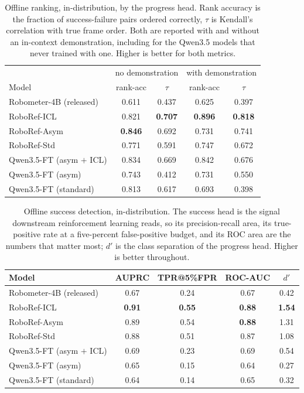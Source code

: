\begin{table}[t]
\centering\footnotesize
\caption[Offline ranking, in-distribution]{Offline ranking, in-distribution, by the progress head. Rank accuracy is the fraction of success-failure pairs ordered correctly, $\tau$ is Kendall's correlation with true frame order. Both are reported with and without an in-context demonstration, including for the Qwen3.5 models that never trained with one. Higher is better for both metrics.}
\label{tab:offline-id-rank}
\begin{tabular}{@{}lcccc@{}}
\toprule
 & \multicolumn{2}{c}{no demonstration} & \multicolumn{2}{c}{with demonstration} \\
Model & rank-acc & $\tau$ & rank-acc & $\tau$ \\
\midrule
Robometer-4B (released) & 0.611 & 0.437 & 0.625 & 0.397 \\
RoboRef-ICL & 0.821 & \textbf{0.707} & \textbf{0.896} & \textbf{0.818} \\
RoboRef-Asym & \textbf{0.846} & 0.692 & 0.731 & 0.741 \\
RoboRef-Std & 0.771 & 0.591 & 0.747 & 0.672 \\
Qwen3.5-FT (asym $+$ ICL) & 0.834 & 0.669 & 0.842 & 0.676 \\
Qwen3.5-FT (asym) & 0.743 & 0.412 & 0.731 & 0.550 \\
Qwen3.5-FT (standard) & 0.813 & 0.617 & 0.693 & 0.398 \\
\bottomrule
\end{tabular}
\end{table}

\begin{table}[t]
\centering\footnotesize
\caption[Offline success detection, in-distribution]{Offline success detection, in-distribution. The success head is the signal downstream reinforcement learning reads, so its precision-recall area, its true-positive rate at a five-percent false-positive budget, and its ROC area are the numbers that matter most; $d'$ is the class separation of the progress head. Higher is better throughout.}
\label{tab:offline-id-succ}
\begin{tabular}{@{}lcccc@{}}
\toprule
Model & AUPRC & TPR@5\%FPR & ROC-AUC & $d'$ \\
\midrule
Robometer-4B (released) & 0.67 & 0.24 & 0.67 & 0.42 \\
RoboRef-ICL & \textbf{0.91} & \textbf{0.55} & \textbf{0.88} & \textbf{1.54} \\
RoboRef-Asym & 0.89 & 0.54 & \textbf{0.88} & 1.31 \\
RoboRef-Std & 0.88 & 0.51 & 0.87 & 1.08 \\
Qwen3.5-FT (asym $+$ ICL) & 0.69 & 0.23 & 0.69 & 0.54 \\
Qwen3.5-FT (asym) & 0.65 & 0.15 & 0.64 & 0.27 \\
Qwen3.5-FT (standard) & 0.64 & 0.14 & 0.65 & 0.32 \\
\bottomrule
\end{tabular}
\end{table}

